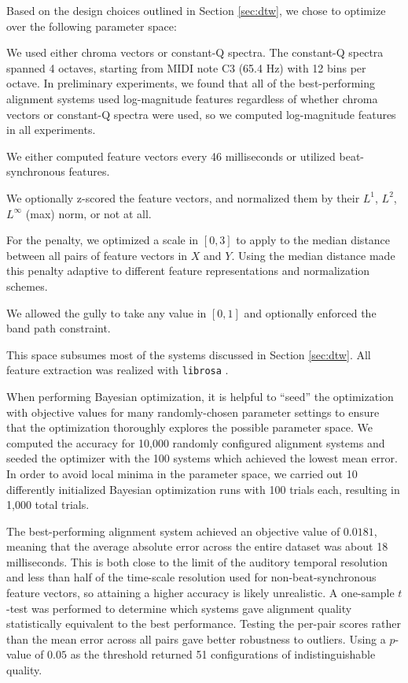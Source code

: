 \documentclass{article}
\begin{document}
Based on the design choices outlined in Section \ref{sec:dtw}, we chose to optimize over the following parameter space:
\begin{description}[topsep=1pt,itemsep=-1pt,leftmargin=5pt]
\item[Feature representation:] We used either chroma vectors or constant-Q spectra.
The constant-Q spectra spanned 4 octaves, starting from MIDI note C3 (65.4 Hz) with 12 bins per octave.
In preliminary experiments, we found that all of the best-performing alignment systems used log-magnitude features regardless of whether chroma vectors or constant-Q spectra were used, so we computed log-magnitude features in all experiments.
\item[Time scale:] We either computed feature vectors every 46 milliseconds or utilized beat-synchronous features.
\item[Normalization:] We optionally z-scored the feature vectors, and normalized them by their $L^1$, $L^2$, $L^\infty$ (max) norm, or not at all.
\item[Penalty:] For the penalty, we optimized a scale in $[0, 3]$ to apply to the median distance between all pairs of feature vectors in $X$ and $Y$.
Using the median distance made this penalty adaptive to different feature representations and normalization schemes.
\item[Gully and band path constraint:] We allowed the gully to take any value in $[0, 1]$ and optionally enforced the band path constraint.
\end{description}
This space subsumes most of the systems discussed in Section \ref{sec:dtw}.
All feature extraction was realized with \texttt{librosa} \cite{mcfee2015librosa, mcfee2015librosa_scipy}.

When performing Bayesian optimization, it is helpful to ``seed'' the optimization with objective values for many randomly-chosen parameter settings to ensure that the optimization thoroughly explores the possible parameter space.
We computed the accuracy for 10,000 randomly configured alignment systems and seeded the optimizer with the 100 systems which achieved the lowest mean error.
In order to avoid local minima in the parameter space, we carried out 10 differently initialized Bayesian optimization runs with 100 trials each, resulting in 1,000 total trials.

The best-performing alignment system achieved an objective value of $0.0181$, meaning that the average absolute error across the entire dataset was about 18 milliseconds.
This is both close to the limit of the auditory temporal resolution and less than half of the time-scale resolution used for non-beat-synchronous feature vectors, so attaining a higher accuracy is likely unrealistic.
A one-sample $t$-test was performed to determine which systems gave alignment quality statistically equivalent to the best performance. Testing the per-pair scores rather than the mean error across all pairs gave better robustness to outliers.  Using a $p$-value of $0.05$ as the threshold returned 51 configurations of indistinguishable quality.
\end{document}
